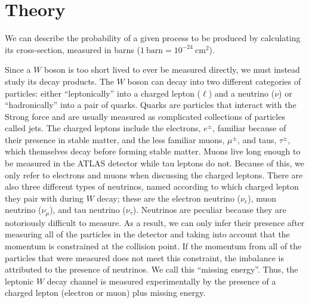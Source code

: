 \chapter{Theory}
\label{sec:theory}







We can describe the probability of a given process to be produced by calculating its cross-section, measured in barns ($1~\textrm{barn}=10^{-24}~\textrm{cm}^2$).


Since a $W$ boson is too short lived to ever be measured directly, we
must instead study its decay products. 
The $W$ boson can decay into two different categories of 
particles: either
``leptonically'' into a charged lepton ($\ell$) and a 
neutrino ($\nu$) or ``hadronically''
into a pair of quarks.
Quarks are particles that interact with the Strong force and are 
usually measured as complicated
collections of particles called jets.
The charged leptons include the 
electrons, $e^{\pm}$, familiar because of their presence in stable matter,
and the less familiar muons, $\mu^{\pm}$, and taus, $\tau^{\pm}$, 
which themselves decay before forming stable matter.  
Muons live long enough to be measured
in the ATLAS detector while tau leptons do not. Because of this, we 
only refer to electrons and muons when discussing the charged leptons.
There are also three different types of neutrinos, named according to which
charged lepton they pair with 
during $W$ decay;  these are the electron neutrino ($\nu_e$),
muon neutrino ($\nu_{\mu}$), and tau neutrino ($\nu_{\tau}$). 
Neutrinos are peculiar 
because they are notoriously difficult to measure.  
As a result, we can only infer their presence after measuring all 
of the particles in the detector and taking into account
that the momentum is constrained at the collision point. If the momentum 
from all of the particles that were measured does not meet this 
constraint, the imbalance is attributed to the
presence of neutrinos. We call this ``missing energy''.  Thus, the 
leptonic $W$  decay channel is measured
experimentally by the presence of a charged lepton 
(electron or muon) plus missing energy.



